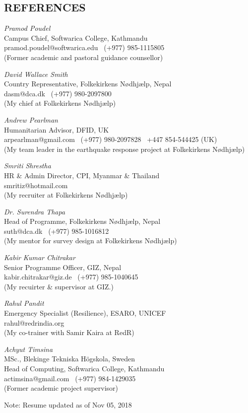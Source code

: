 \documentclass[margin, 10pt]{res}
\begin{document}
\begin{resume}
\newpage

\section{REFERENCES}
\emph{Pramod Poudel}\\
Campus Chief, Softwarica College, Kathmandu\\
pramod.poudel@softwarica.edu \textbar \ (+977) 985-1115805\\
(Former academic and pastoral guidance counsellor)


\emph{David Wallace Smith}\\
Country Representative, Folkekirkens Nødhjælp, Nepal\\
dasm@dca.dk \textbar \ (+977) 980-2097800\\
(My chief at Folkekirkens Nødhjælp)


\emph{Andrew Pearlman}\\
Humanitarian  Advisor, DFID, UK\\
arpearlman@gmail.com \textbar \  (+977) 980-2097828 \textbar \ +447 854-544425 (UK)\\
(My team leader in the earthquake response project at Folkekirkens Nødhjælp)


\emph{Smriti Shrestha}\\
HR \& Admin Director, CPI, Myanmar \& Thailand\\
smritiz@hotmail.com\\
(My recruiter at Folkekirkens Nødhjælp)


\emph{Dr. Surendra Thapa}\\
Head of Programme, Folkekirkens Nødhjælp, Nepal\\
suth@dca.dk \textbar \ (+977) 985-1016812\\
(My mentor for survey design at Folkekirkens Nødhjælp)


\emph{Kabir Kumar Chitrakar}\\
Senior Programme Officer, GIZ, Nepal\\
kabir.chitrakar@giz.de \textbar \ (+977) 985-1040645\\
(My recuirter \& supervisor at GIZ.)


\emph{Rahul Pandit}\\
Emergency Specialist (Resilience), ESARO, UNICEF\\
rahul@redrindia.org\\
(My co-trainer with Samir Kaira at RedR)


\emph{Achyut Timsina}\\
MSc., Blekinge Tekniska Högskola, Sweden\\
Head of Computing, Softwarica College, Kathmandu\\
actimsina@gmail.com \textbar \ (+977) 984-1429035\\
(Former academic project supervisor)

\vfill
\hfill \small{Note: Resume updated as of Nov 05, 2018}
\end{resume}
\end{document}

